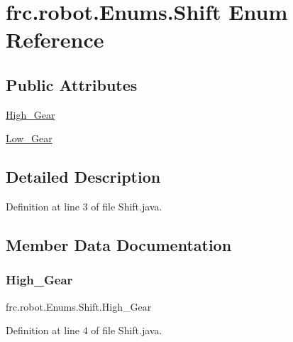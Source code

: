 \hypertarget{enumfrc_1_1robot_1_1Enums_1_1Shift}{}\section{frc.\+robot.\+Enums.\+Shift Enum Reference}
\label{enumfrc_1_1robot_1_1Enums_1_1Shift}
\subsection*{Public Attributes}
\begin{DoxyCompactItemize}
\item 
\hyperlink{enumfrc_1_1robot_1_1Enums_1_1Shift_a66efd5ef2833112e313f06303c7c6003}{High\+\_\+\+Gear}
\item 
\hyperlink{enumfrc_1_1robot_1_1Enums_1_1Shift_a057c3458651c7a916da4241ae52b56d0}{Low\+\_\+\+Gear}
\end{DoxyCompactItemize}


\subsection{Detailed Description}


Definition at line 3 of file Shift.\+java.



\subsection{Member Data Documentation}
\mbox{\label{enumfrc_1_1robot_1_1Enums_1_1Shift_a66efd5ef2833112e313f06303c7c6003}} 
\subsubsection{\texorpdfstring{High\+\_\+\+Gear}{High\_Gear}}
{\footnotesize\ttfamily frc.\+robot.\+Enums.\+Shift.\+High\+\_\+\+Gear}



Definition at line 4 of file Shift.\+java.

\mbox{\label{enumfrc_1_1robot_1_1Enums_1_1Shift_a057c3458651c7a916da4241ae52b56d0}} 
